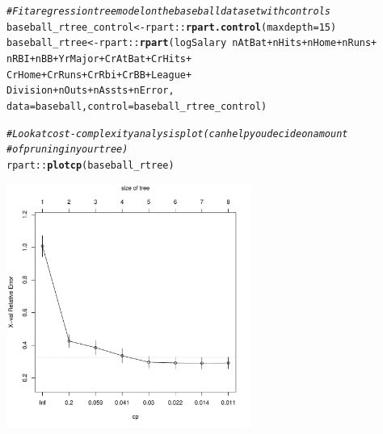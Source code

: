 \documentclass{article}\usepackage[]{graphicx}\usepackage[]{color}
\makeatletter
\newcommand{\hlnum}[1]{\textcolor[rgb]{0.686,0.059,0.569}{#1}}%
\newcommand{\hlcom}[1]{\textcolor[rgb]{0.678,0.584,0.686}{\textit{#1}}}%
\newcommand{\hlopt}[1]{\textcolor[rgb]{0,0,0}{#1}}%
\newcommand{\hlstd}[1]{\textcolor[rgb]{0.345,0.345,0.345}{#1}}%
\newcommand{\hlkwb}[1]{\textcolor[rgb]{0.69,0.353,0.396}{#1}}%
\newcommand{\hlkwc}[1]{\textcolor[rgb]{0.333,0.667,0.333}{#1}}%
\newcommand{\hlkwd}[1]{\textcolor[rgb]{0.737,0.353,0.396}{\textbf{#1}}}%
\newenvironment{kframe}{%
 \def\at@end@of@kframe{}%
 \ifinner\ifhmode%
  \def\at@end@of@kframe{\end{minipage}}%
  \begin{minipage}{\columnwidth}%
 \fi\fi%
 \def\FrameCommand##1{\hskip\@totalleftmargin \hskip-\fboxsep
 \colorbox{shadecolor}{##1}\hskip-\fboxsep
     \hskip-\linewidth \hskip-\@totalleftmargin \hskip\columnwidth}%
 \MakeFramed {\advance\hsize-\width
   \@totalleftmargin\z@ \linewidth\hsize
   \@setminipage}}%
 {\par\unskip\endMakeFramed%
 \at@end@of@kframe}
\newenvironment{knitrout}{}{} %
\makeatother
\begin{document}
\begin{knitrout}
\color{fgcolor}\begin{kframe}
\begin{alltt}
\hlcom{# Fit a regression tree model on the baseball dataset with controls}
\hlstd{baseball_rtree_control} \hlkwb{<-} \hlstd{rpart}\hlopt{::}\hlkwd{rpart.control}\hlstd{(}\hlkwc{maxdepth} \hlstd{=} \hlnum{15}\hlstd{)}
\hlstd{baseball_rtree} \hlkwb{<-} \hlstd{rpart}\hlopt{::}\hlkwd{rpart}\hlstd{(logSalary} \hlopt{~} \hlstd{nAtBat} \hlopt{+} \hlstd{nHits} \hlopt{+} \hlstd{nHome} \hlopt{+} \hlstd{nRuns} \hlopt{+}
                                 \hlstd{nRBI} \hlopt{+} \hlstd{nBB} \hlopt{+} \hlstd{YrMajor} \hlopt{+} \hlstd{CrAtBat} \hlopt{+} \hlstd{CrHits} \hlopt{+}
                                 \hlstd{CrHome} \hlopt{+} \hlstd{CrRuns} \hlopt{+} \hlstd{CrRbi} \hlopt{+} \hlstd{CrBB} \hlopt{+} \hlstd{League} \hlopt{+}
                                 \hlstd{Division} \hlopt{+} \hlstd{nOuts} \hlopt{+} \hlstd{nAssts} \hlopt{+} \hlstd{nError,}
                               \hlkwc{data} \hlstd{= baseball,} \hlkwc{control} \hlstd{= baseball_rtree_control)}

\hlcom{# Look at cost-complexity analysis plot (can help you decide on amount}
\hlcom{# of pruning in your tree)}
\hlstd{rpart}\hlopt{::}\hlkwd{plotcp}\hlstd{(baseball_rtree)}
\end{alltt}
\end{kframe}

{\centering \includegraphics[width=0.6\textwidth]{figure/unnamed-chunk-4-1} 

}



\end{knitrout}
\end{document}
